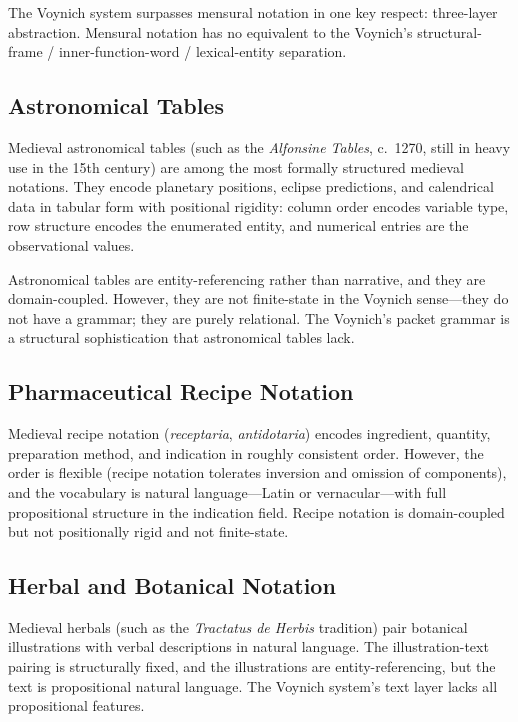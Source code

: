 \documentclass[11pt,a4paper,twocolumn]{article}
\begin{document}
The Voynich system surpasses mensural notation in one key respect: three-layer abstraction. Mensural notation has no equivalent to the Voynich's structural-frame / inner-function-word / lexical-entity separation.

\subsection{Astronomical Tables}

Medieval astronomical tables (such as the \textit{Alfonsine Tables}, c.\ 1270, still in heavy use in the 15th century) are among the most formally structured medieval notations. They encode planetary positions, eclipse predictions, and calendrical data in tabular form with positional rigidity: column order encodes variable type, row structure encodes the enumerated entity, and numerical entries are the observational values.

Astronomical tables are entity-referencing rather than narrative, and they are domain-coupled. However, they are not finite-state in the Voynich sense---they do not have a grammar; they are purely relational. The Voynich's packet grammar is a structural sophistication that astronomical tables lack.

\subsection{Pharmaceutical Recipe Notation}

Medieval recipe notation (\textit{receptaria}, \textit{antidotaria}) encodes ingredient, quantity, preparation method, and indication in roughly consistent order. However, the order is flexible (recipe notation tolerates inversion and omission of components), and the vocabulary is natural language---Latin or vernacular---with full propositional structure in the indication field. Recipe notation is domain-coupled but not positionally rigid and not finite-state.

\subsection{Herbal and Botanical Notation}

Medieval herbals (such as the \textit{Tractatus de Herbis} tradition) pair botanical illustrations with verbal descriptions in natural language. The illustration-text pairing is structurally fixed, and the illustrations are entity-referencing, but the text is propositional natural language. The Voynich system's text layer lacks all propositional features.
\end{document}
